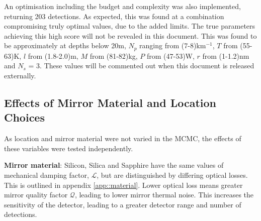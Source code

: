 \documentclass{article}
\begin{document}
An optimisation including the budget and complexity was also
implemented, returning 203 detections. As expected, this was found at
a combination compromising truly optimal values, due to the added
limits. The true parameters achieving this high score will not be
revealed in this document. 
This was found to be approximately at depths below 20m, $N_p$ ranging
from (7-8)km$^{-1}$, $T$ from (55-63)K, $l$ from (1.8-2.0)m,  $M$ from
(81-82)kg, $P$ from (47-53)W, $r$ from (1-1.2)nm and $N_s$ = 3. These
values will be commented out when this document is released
externally. 


\subsection{Effects of Mirror Material and Location Choices}
As location and mirror material were not varied in the MCMC, the
effects of these variables were tested independently. 

\textbf{Mirror material}: Silicon, Silica and Sapphire have the same
values of mechanical damping factor, $\mathcal{L}$, but are
distinguished by differing optical losses. This is outlined in
appendix \ref{app::material}. Lower optical loss means greater mirror
quality factor $\mathcal{Q}$, leading to lower mirror thermal
noise. This increases the sensitivity of the detector, leading to a
greater detector range and number of detections. 
\end{document}
